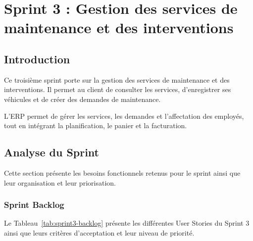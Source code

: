 
\chapter{Sprint 3 : Gestion des services de maintenance et des interventions}
\localtableofcontents
\newpage
\section{Introduction}

Ce troisième sprint porte sur la gestion des services de maintenance et des interventions. Il permet au client de consulter les services, d'enregistrer ses véhicules et de créer des demandes de maintenance.

L'ERP permet de gérer les services, les demandes et l'affectation des employés, tout en intégrant la planification, le panier et la facturation.


\section{Analyse du Sprint}

Cette section présente les besoins fonctionnels retenus pour le sprint ainsi que leur organisation et leur priorisation.

\subsection*{Sprint Backlog}

Le Tableau~\ref{tab:sprint3-backlog} présente les différentes User Stories du Sprint 3 ainsi que leurs critères d'acceptation et leur niveau de priorité.

